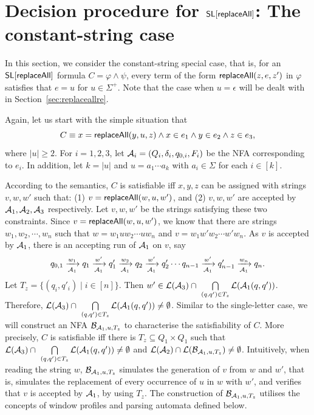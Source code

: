 
\section{Decision procedure for $\mathsf{SL}[\mathsf{replaceAll}]$: The constant-string case}\label{sec:replaceallcs}

In this section, we consider the constant-string special case, that is, for an $\mathsf{SL}[\mathsf{replaceAll}]$ formula $C = \varphi \wedge \psi$, every term of the form $\mathsf{replaceAll}(z, e, z')$ in $\varphi$ satisfies that $e=u$ for $u \in \Sigma^+$. Note that the case when $u=\epsilon$ will be dealt with in Section~\ref{sec:replaceallre}. 

Again, let us start with the simple situation that
$$C \equiv x = \mathsf{replaceAll}(y, u, z) \wedge x \in e_1 \wedge y \in e_2 \wedge z \in e_3,$$
where $|u| \ge 2$. For $i=1,2,3$, let $\mathcal{A}_i = (Q_i, \delta_i, q_{0, i}, F_i)$
be the NFA corresponding to $e_i$. In addition, let $k = |u|$ and $u = a_1 \cdots a_k$ with $a_i \in \Sigma$ for each $i \in [k]$.

According to the semantics, $C$ is satisfiable iff $x, y, z$ can be assigned with  strings $v, w, w'$ such that: (1) $v = \mathsf{replaceAll}(w, u, w')$, and (2) $v,w, w'$ are accepted by $\mathcal{A}_1, \mathcal{A}_2, \mathcal{A}_3$ respectively. Let $v, w, w'$ be the strings satisfying these two constraints. Since $v = \mathsf{replaceAll}(w, u, w')$, we know that there are strings $w_1, w_2, \cdots, w_n$ such that $w= w_1 u w_2 \cdots u w_n$ and $v = w_1 w' w_2 \cdots w' w_n$. As $v$ is accepted by $\mathcal{A}_1$, there is an accepting run of $\mathcal{A}_1$ on $v$, say
$$
q_{0,1} \xrightarrow[\mathcal{A}_1]{w_1} q_1 \xrightarrow[\mathcal{A}_1]{w'} q'_1 \xrightarrow[\mathcal{A}_1]{w_2} q_2 \xrightarrow[\mathcal{A}_1]{w'} q'_2 \cdots q_{n-1} \xrightarrow[\mathcal{A}_1]{w'} q'_{n-1} \xrightarrow[\mathcal{A}_1]{w_n} q_n.
$$
Let $T_z = \{(q_i, q'_i) \mid i \in [n]\}$. Then $w' \in \mathcal{L}(\mathcal{A}_3) \cap\ \bigcap \limits_{(q,q') \in T_z} \mathcal{L}(\mathcal{A}_1(q, q'))$. Therefore, $\mathcal{L}(\mathcal{A}_3) \cap\ \bigcap \limits_{(q,q') \in T_z} \mathcal{L}(\mathcal{A}_1(q, q')) \neq \emptyset$. Similar to the single-letter case, we will construct an NFA $\mathcal{B}_{\mathcal{A}_1, u, T_z}$ to characterise the satisfiability of $C$.  More precisely, $C$ is satisfiable iff there is $T_z \subseteq Q_1 \times Q_1$ such that $\mathcal{L}(\mathcal{A}_3) \cap\ \bigcap \limits_{(q,q') \in T_z} \mathcal{L}(\mathcal{A}_1(q, q')) \neq \emptyset$ and
$\mathcal{L}(\mathcal{A}_2) \cap \mathcal{L}(\mathcal{B}_{\mathcal{A}_1, u, T_z}) \neq \emptyset$. Intuitively, when reading the string $w$, $\mathcal{B}_{\mathcal{A}_1, u, T_z}$ simulates the generation of $v$ from $w$ and $w'$, that is, simulates the replacement of  every occurrence of $u$ in $w$ with $w'$, and verifies that $v$ is accepted by $\mathcal{A}_1$, by using $T_z$.
The construction of $\mathcal{B}_{\mathcal{A}_1, u, T_z}$ utilises the concepts of window profiles and parsing automata defined below.
%


